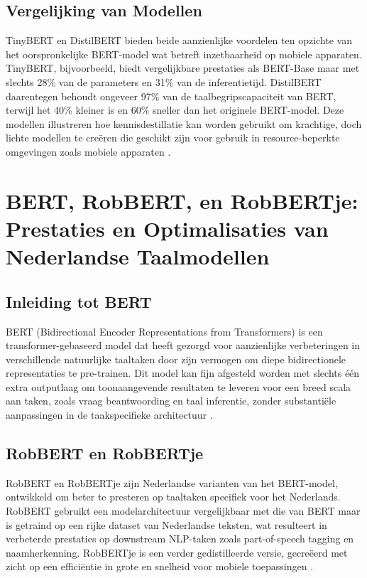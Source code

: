 \subsection{Vergelijking van Modellen}

TinyBERT en DistilBERT bieden beide aanzienlijke voordelen ten opzichte van het oorspronkelijke BERT-model wat betreft inzetbaarheid op mobiele apparaten. TinyBERT, bijvoorbeeld, biedt vergelijkbare prestaties als BERT-Base maar met slechts 28\% van de parameters en 31\% van de inferentietijd. DistilBERT daarentegen behoudt ongeveer 97\% van de taalbegripscapaciteit van BERT, terwijl het 40\% kleiner is en 60\% sneller dan het originele BERT-model. Deze modellen illustreren hoe kennisdestillatie kan worden gebruikt om krachtige, doch lichte modellen te creëren die geschikt zijn voor gebruik in resource-beperkte omgevingen zoals mobiele apparaten \autocite{Sanh2019DistilBERT}.


\section{BERT, RobBERT, en RobBERTje: Prestaties en Optimalisaties van Nederlandse Taalmodellen}

\subsection{Inleiding tot BERT}

BERT (Bidirectional Encoder Representations from Transformers) is een trans\-for\-mer-gebaseerd model dat heeft gezorgd voor aanzienlijke verbeteringen in verschillende natuurlijke taaltaken door zijn vermogen om diepe bidirectionele representaties te pre-trainen. Dit model kan fijn afgesteld worden met slechts één extra outputlaag om toonaangevende resultaten te leveren voor een breed scala aan taken, zoals vraag beantwoording en taal inferentie, zonder substantiële aanpassingen in de taakspecifieke architectuur \autocite{Devlin2019}.

\subsection{RobBERT en RobBERTje}

RobBERT en RobBERTje zijn Nederlandse varianten van het BERT-model, ontwikkeld om beter te presteren op taaltaken specifiek voor het Nederlands. RobBERT gebruikt een modelarchitectuur vergelijkbaar met die van BERT maar is getraind op een rijke dataset van Nederlandse teksten, wat resulteert in verbeterde prestaties op downstream NLP-taken zoals part-of-speech tagging en naamherkenning. RobBERTje is een verder gedistilleerde versie, gecreëerd met zicht op een efficiëntie in grote en snelheid voor mobiele toepassingen \autocite{Vries2019}.

